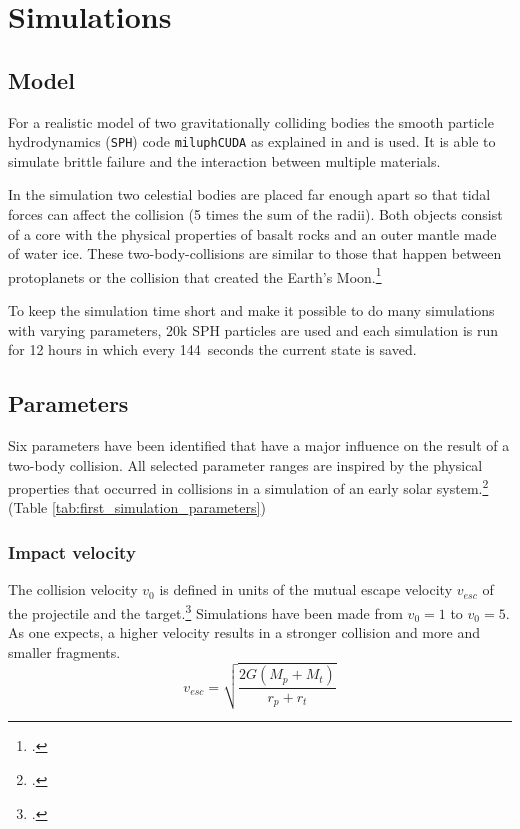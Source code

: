 \chapter{Simulations}
\label{chapter:simulations}
\section{Model}

For a realistic model of two gravitationally colliding bodies the smooth particle hydrodynamics (\texttt{SPH}) code \texttt{miluphCUDA} as explained in \cite{Schaefer2016} and \cite{miluphaCode} is used. It is able to simulate brittle failure and the interaction between multiple materials. 

In the simulation two celestial bodies are placed far enough apart so that tidal forces can affect the collision (5 times the sum of the radii). Both objects consist of a core with the physical properties of basalt rocks and an outer mantle made of water ice. These two-body-collisions are similar to those that happen between protoplanets or the collision that created the Earth's Moon.\footcite{dvorakMoon}

To keep the simulation time short and make it possible to do many simulations with varying parameters, 20k SPH particles are used and each simulation is run for 12 hours in which every 144~seconds the current state is saved.

\section{Parameters}
\label{sec:parameters}

Six parameters have been identified that have a major influence on the result of a two-body collision. All selected parameter ranges are inspired by the physical properties that occurred in collisions in a simulation of an early solar system.\footcite{CollisionParameters} (Table \ref{tab:first_simulation_parameters})

\subsection{Impact velocity}

The collision velocity $v_0$ is defined in units of the mutual escape velocity $v_{esc}$ of the projectile and the target.\footcite{MaindlSummary} Simulations have been made from $v_0=1$ to $v_0=5$. As one expects, a higher velocity results in a stronger collision and more and smaller fragments.
\begin{equation}
	v_{esc}=\sqrt{\frac{2G(M_p+M_t)}{r_p+r_t}}
\end{equation}

